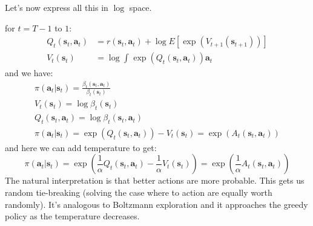 \documentclass{report}
\begin{document}
Let's now express all this in $ \log  $ space.

for $ t = T -1  $ to $ 1  $:
\begin{align}
Q_{ t } (\bm{s}_{t}, \bm{a}_{t} ) &= r (\bm{s}_{t}, \bm{a}_{t} ) + \log E \left[ \exp (V_{ t+1 } (\bm{s}_{t+1})) \right] \\
V_{ t } (\bm{s}_{t}) &= \log \int_{}^{} \exp (Q_{ t } (\bm{s}_{t}, \bm{a}_{t} )) \bm{a}_{t}
\end{align}
and we have:
\begin{gather}
\pi (\bm{a}_{t}| \bm{s}_{t} ) = \frac{\beta_{ t }(\bm{s}_{t}, \bm{a}_{t} )}{\beta_{ t } (\bm{s}_{t})} \\
V_{ t } (\bm{s}_{t}) = \log \beta_{ t } ( \bm{s}_{t}) \\
Q_{ t } (\bm{s}_{t}, \bm{a}_{t} )= \log \beta_{ t } (\bm{s}_{t}, \bm{a}_{t} ) \\
\pi (\bm{a}_{t}| \bm{s}_{t} ) = \exp (Q_{ t }(\bm{s}_{t}, \bm{a}_{t} )) - V_{ t } (\bm{s}_{t}) = \exp (A_{ t }(\bm{s}_{t}, \bm{a}_{t} ))
\end{gather}
and here we can add temperature to get:
\begin{equation}
		\pi (\bm{a}_{t}| \bm{s}_{t} ) = \exp (\frac{1}{\alpha} Q_{ t }(\bm{s}_{t}, \bm{a}_{t} ) - \frac{1}{\alpha} V_{ t } (\bm{s}_{t}) ) = \exp (\frac{1}{\alpha} A_{ t }(\bm{s}_{t}, \bm{a}_{t} ))
\end{equation}
The natural interpretation is that better actions are more probable.
This gets us random tie-breaking (solving the case where to action are equally worth randomly).
It's analogous to Boltzmann exploration and it approaches the greedy policy as the temperature decreases.
\end{document}
